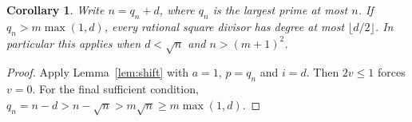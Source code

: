 \documentclass[11pt]{article}
\newtheorem{corollary}[theorem]{Corollary}
\begin{document}
\begin{corollary}\label{cor:preceding}
Write $n=q_n+d$, where $q_n$ is the largest prime at most $n$.
If $q_n>m\max(1,d)$, every rational square divisor has degree at most
$\lfloor d/2\rfloor$. In particular this applies when
$d<\sqrt n$ and $n>(m+1)^2$.
\end{corollary}
\begin{proof}
Apply Lemma~\ref{lem:shift} with $a=1$, $p=q_n$ and $i=d$.
Then $2v\le1$ forces $v=0$. For the final sufficient condition,
$q_n=n-d>n-\sqrt n>m\sqrt n\ge m\max(1,d)$.
\end{proof}
\end{document}
